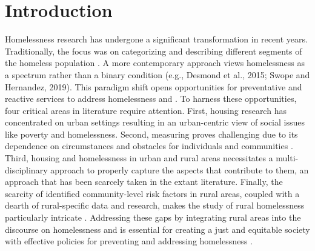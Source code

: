 \chapter{Introduction} 

Homelessness research has undergone a significant transformation in recent years. Traditionally, the focus was on categorizing and describing different segments of the homeless population \citep{lee_homelessness_2021}. A more contemporary approach views homelessness as a spectrum rather than a binary condition (e.g., Desmond et al., 2015; Swope and Hernandez, 2019). This paradigm shift opens opportunities for preventative and reactive services to address homelessness and \hs. To harness these opportunities, four critical areas in literature require attention. First, housing research has concentrated on urban settings resulting in an urban-centric view of social issues like poverty and homelessness. Second, measuring \hs proves challenging due to its dependence on circumstances and obstacles for individuals and communities \citep{leifheit_building_2022}. Third, housing and homelessness in urban and rural areas necessitates a multi-disciplinary approach to properly capture the aspects that contribute to them, an approach that has been scarcely taken in the extant literature.  Finally, the scarcity of identified community-level risk factors in rural areas, coupled with a dearth of rural-specific data and research, makes the study of rural homelessness particularly intricate \citep{gleason_using_2021}. Addressing these gaps by integrating rural areas into the discourse on homelessness and \hs is essential for creating a just and equitable society with effective policies for preventing and addressing homelessness \citep{oregan_how_2021-1}.

